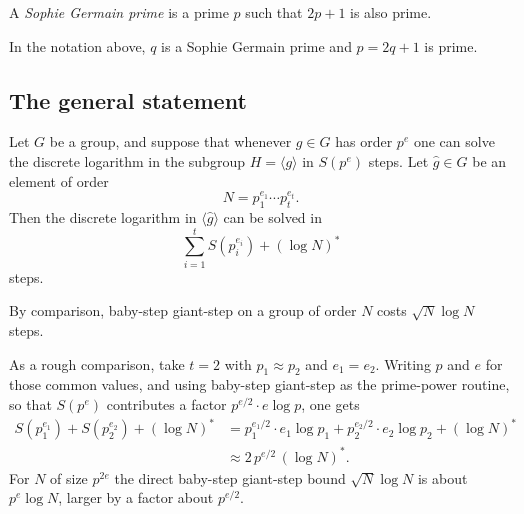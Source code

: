 \begin{definition}
A \emph{Sophie Germain prime} is a prime \(p\) such that \(2p+1\) is also
prime.
\end{definition}
In the notation above, \(q\) is a Sophie Germain prime and \(p=2q+1\) is
prime.

\subsection{The general statement}

\begin{keybox}
\begin{theorem}
Let \(G\) be a group, and suppose that whenever \(g\in G\) has order
\(p^e\) one can solve the discrete logarithm in the subgroup
\(H=\langle g\rangle\) in \(S(p^e)\) steps.
Let \(\hat g\in G\) be an
element of order
\[
    N = p_1^{e_1}\cdots p_t^{e_t}.
\]
Then the discrete logarithm in \(\langle\hat g\rangle\) can be solved in
\[
    \sum_{i=1}^{t} S(p_i^{e_i}) + (\log N)^{*}
\]
steps.
\end{theorem}
\end{keybox}

By comparison, baby-step giant-step on a group of order \(N\) costs
\(\sqrt{N}\log N\) steps.


As a rough comparison, take \(t=2\) with \(p_1\approx p_2\) and
\(e_1=e_2\). Writing \(p\) and \(e\) for those common values, and using
baby-step giant-step as the prime-power routine, so that
\(S(p^e)\) contributes a factor \(p^{e/2}\cdot e\log p\), one gets
\begin{align*}
    S(p_1^{e_1})+S(p_2^{e_2})+(\log N)^{*}
    &= p_1^{e_1/2}\cdot e_1\log p_1
       + p_2^{e_2/2}\cdot e_2\log p_2
       + (\log N)^{*}\\
    &\approx 2\,p^{e/2}\,(\log N)^{*}.
\end{align*}
For \(N\) of size \(p^{2e}\) the direct baby-step giant-step bound
\(\sqrt{N}\log N\) is about \(p^{e}\log N\), larger by a factor about
\(p^{e/2}\).

